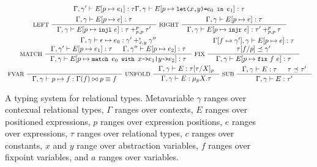 \begin{figure}
\begin{gather*}
{      %
      \Gamma, \gamma' \judges \upd{ E }{ p }{ e_1 } : \tau }{
      \Gamma, \gamma \judges \upd{E}{p}{ \letexp{x}{y}{e_0}{e_1} } : %
      \tau } \\
    \inference[ LEFT ]{
      \Gamma, \gamma \judges \upd{E}{p}{ e } : \tau }{
      \Gamma, \gamma \judges \upd{E}{p}{ \injl\ e} : %
      \tau +_{p, p}^p \tau' } 
    \inference[ RIGHT ]{
      \Gamma, \gamma \judges \upd{E}{p}{ e } : \tau }{
      \Gamma, \gamma \judges \upd{E}{p}{ \injr\ e} : %
      \tau' +_{p, p}^p \tau } \\
    \inference[ MATCH ]{
      \Gamma, \gamma \judges \epsilon \mapsto e_0 : %
      \gamma' +_{x, y}^\epsilon \gamma'' \\
      \Gamma, \gamma' \judges \upd{E}{p}{e_1} : \tau &
      \Gamma, \gamma'' \judges \upd{E}{p}{e_2} : \tau }{
      \Gamma, \gamma \judges %
      \upd{E}{p}{ \matchexp{e_0}{ x }{e_1}{ y }{e_2} } : \tau } 
    \inference[ FIX ]{
      \upd{ \Gamma }{ f }{ \gamma' }, \gamma \judges %
      \upd{ E }{ p }{ e } : \tau \\
      \replace{ \tau }{ p }{ f } \subtype \gamma' }{ %
      \Gamma, \gamma \judges \upd{ E }{ p }{ \fix{f}{e} }: \tau } \\
    \inference[ FVAR ]{ }{
      \Gamma, \gamma \judges p \mapsto f : %
      \Gamma(f) \joinctr p \equiv f} 
    \inference[ UNFOLD ]{
      \Gamma, \gamma \judges E : \replace{ \tau }{ X }{ \tau }_p }{ 
      \Gamma, \gamma \judges E : \mu_p X. \tau } 
    \inference[ SUB ]{
      \Gamma, \gamma \judges E : \tau &
      \tau \subtype \tau' }{ %
      \Gamma, \gamma \judges E : \tau' }
  \end{gather*}
  \caption{A typing system for relational types.
    Metavariable %
    $\gamma$ ranges over contexual relational types, %
    $\Gamma$ ranges over contexts, %
    $E$ ranges over positioned expressions, %
    $p$ ranges over expression positions, %
    $e$ ranges over expressions, %
    $\tau$ ranges over relational types, %
    $c$ ranges over constants, %
    $x$ and $y$ range over abstraction variables, %
    $f$ ranges over fixpoint variables, and %
    $a$ ranges over variables. }
  \label{fig:reltypes-rules}
\end{figure}

